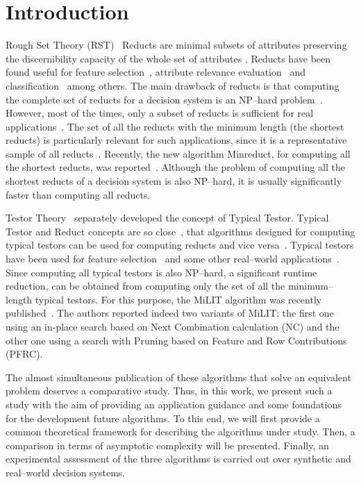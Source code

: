 \documentclass[citenumber]{llncs}
\begin{document}
\section{Introduction}
%
	Rough Set Theory (RST)~\cite{Pawlak82} Reducts are minimal subsets of attributes preserving the discernibility capacity of the whole set of attributes \cite{Pawlak91}. Reducts have been found useful for feature selection~\cite{Nguyen2016,Alwesabi2016}, attribute relevance evaluation~\cite{Inuiguchi2017} and classification~\cite{Ishii2018,Own2015} among others. The main drawback of reducts is that computing the complete set of reducts for a decision system is an NP--hard problem~\cite{Skowron92}. However, most of the times, only a subset of reducts is sufficient for real applications~\cite{Zheng14,Jiang15}. The set of all the reducts with the minimum length (the shortest reducts) is particularly relevant for such applications, since it is a representative sample of all reducts~\cite{Susmaga1998}. Recently, the new algorithm Minreduct, for computing all the shortest reducts, was reported~\cite{rodriguez20}. Although the problem of computing all the shortest reducts of a decision system is also NP--hard, it is usually significantly faster than computing all reducts.
	
	Testor Theory~\cite{Cheguis55} separately developed the concept of Typical Testor. Typical Testor and Reduct concepts are so close~\cite{Chikalov2013}, that algorithms designed for computing typical testors can be used for computing reducts and vice versa~\cite{Lazo15}. Typical testors have been used for feature selection~\cite{Dmitriev1966,Ruiz08} and some other real--world applications~\cite{Torres2014}. Since computing all typical testors is also NP--hard, a significant runtime reduction, can be obtained from computing only the set of all the minimum--length typical testors. For this purpose, the MiLIT algorithm was recently published~\cite{Piza20}. The authors reported indeed two variants of MiLIT: the first one using an in-place search based on Next
	Combination calculation (NC) and the other one using a search with Pruning based on Feature and
	Row Contributions (PFRC).
	
	
	
	The almost simultaneous publication of these algorithms that solve an equivalent problem deserves a comparative study. Thus, in this work, we present such a study with the aim of providing an application guidance and some foundations for the development future algorithms. To this end, we will first provide a common theoretical framework for describing the algorithms under study. Then, a comparison in terms of asymptotic complexity will be presented. Finally, an experimental assessment of the three algorithms is carried out over synthetic and real--world decision systems. 
	
\end{document}
